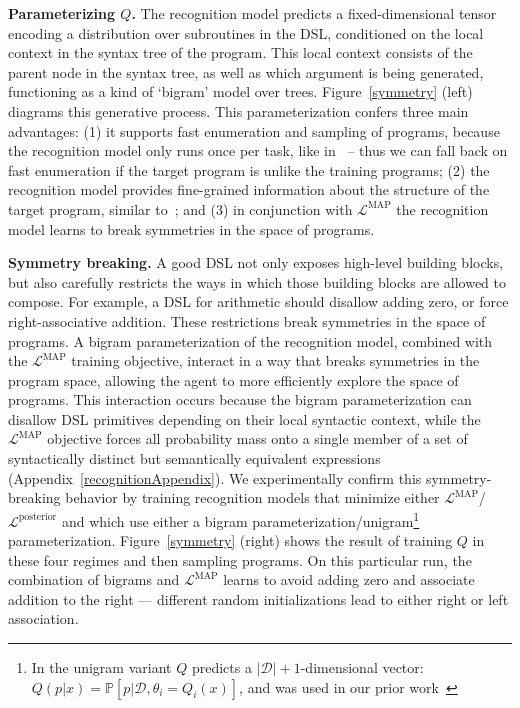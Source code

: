 \documentclass{article}
\newcommand{\probability}{\mathds{P}} %
\begin{document}
\noindent\textbf{Parameterizing $Q$.} The recognition model predicts a
fixed-dimensional tensor encoding a distribution over subroutines in
the DSL, conditioned on the local context in the syntax tree of the
program. This local context consists of the parent node in the syntax
tree, as well as which argument is being generated, functioning as a
kind of `bigram' model over trees. Figure~\ref{symmetry} (left)
diagrams this generative process.  This parameterization confers three
main advantages: (1) it supports fast enumeration and sampling of
programs, because the recognition model only runs once per
task, like in~\cite{balog2016deepcoder,ecc,menon2013machine} -- thus
we can fall back on fast enumeration if the target program is unlike
the training programs; (2) the recognition model provides fine-grained
information about the structure of the target program, similar
to~\cite{devlin2017robustfill,zavershynskyi2018naps}; and (3) in
conjunction with $\mathcal{L}^{\text{MAP}}$ the recognition model
learns to break symmetries in the space of programs.

\noindent\textbf{Symmetry breaking.} A good DSL not only exposes high-level building blocks, but also
carefully restricts the ways in which those building blocks are
allowed to compose.  For example,
a DSL for arithmetic should disallow adding zero, or force
right-associative addition.  These restrictions break symmetries in
the space of programs.  A bigram parameterization of the recognition
model, combined with the $\mathcal{L}^{\text{MAP}}$ training
objective, interact in a way that breaks symmetries in the program
space, allowing the agent to more efficiently explore the space of
programs.  This interaction occurs because the bigram parameterization
can disallow DSL primitives depending on their local syntactic
context, while the $\mathcal{L}^{\text{MAP}}$ objective forces all
probability mass onto a single member of a set of syntactically
distinct but semantically equivalent expressions
(Appendix~\ref{recognitionAppendix}).
We experimentally confirm this symmetry-breaking
behavior by training recognition models that minimize either
$\mathcal{L}^{\text{MAP}}$/$\mathcal{L}^\text{posterior}$ and which
use either a bigram parameterization/unigram\footnote{In the unigram variant $Q$ predicts a $|\mathcal{D}| + 1$-dimensional vector: $Q(p|x) = \probability[p|\mathcal{D},\theta_i = Q_i(x)]$,
  and was used in our prior work~\cite{ecc}} parameterization.
Figure~\ref{symmetry} (right) shows the result of training $Q$ in these four regimes
and then sampling programs.
On this particular run,
the combination of
bigrams and $\mathcal{L}^{\text{MAP}}$ learns to
avoid adding zero and associate addition to the right ---
different random initializations
lead to either right or left association.
\end{document}
